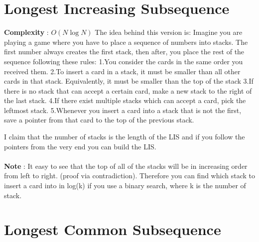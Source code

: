     
	
	\section{Longest Increasing Subsequence}
	
	{\bf Complexity} : $O(N\log{N})$
    The idea behind this version is:
    Imagine you are playing a game where you have to place a sequence of numbers 
    into stacks. The first number always creates the first stack, then after, 
    you place the rest of the sequence following these rules:
    1.\indent You consider the cards in the same order you received them.
    2.\indent To insert a card in a stack, it must be smaller than all other 
    cards in that stack. Equivalently, it must be smaller than the top of the 
    stack
    3.\indent If there is no stack that can accept a certain card, make a new 
    stack to the right of the last stack.
    4.\indent If there exist multiple stacks which can accept a card, pick the 
    leftmost stack.
    5.\indent Whenever you insert a card into a stack that is not the first, 
    save a pointer from that card to the top of the previous stack.
                                                                                                                      	
    I claim that the number of stacks is the length of the LIS and if you follow 
    the pointers from the very end you can build the LIS.\\
    \ \\                                                                                                           	                                           
    {\bf Note} : It easy to see that the top of all of the stacks will be in increasing 
    order from left to right. (proof via contradiction). Therefore you can find which stack to insert a card 
into in log(k) if you use a binary search, where k is the number of stack.\\

    
	
	\section{Longest Common Subsequence}
	
